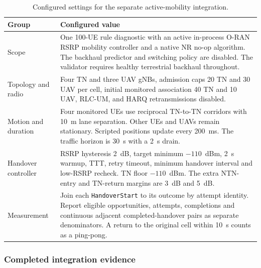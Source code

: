 \begin{table}[t]
\centering
\footnotesize
\caption{Configured settings for the separate active-mobility integration.}
\label{tab:audited_mobility_configuration}
\begin{tabular}{p{} p{}}
\hline
Group & Configured value \\
\hline
Scope & One 100-UE rule diagnostic with an active in-process O-RAN RSRP mobility controller and a native NR no-op algorithm. The backhaul predictor and switching policy are disabled. The validator requires healthy terrestrial backhaul throughout. \\
Topology and radio & Four TN and three UAV gNBs, admission caps 20 TN and 30 UAV per cell, initial monitored association 40 TN and 10 UAV, RLC-UM, and HARQ retransmissions disabled. \\
Motion and duration & Four monitored UEs use reciprocal TN-to-TN corridors with 10~m lane separation. Other UEs and UAVs remain stationary. Scripted positions update every 200~ms. The traffic horizon is 30~s with a 2~s drain. \\
Handover controller & RSRP hysteresis 2~dB, target minimum $-110$~dBm, 2~s warmup, TTT, retry timeout, minimum handover interval and low-RSRP recheck. TN floor $-110$~dBm. The extra NTN-entry and TN-return margins are 3~dB and 5~dB. \\
Measurement & Join each \texttt{HandoverStart} to its outcome by attempt identity. Report eligible opportunities, attempts, completions and continuous adjacent completed-handover pairs as separate denominators. A return to the original cell within 10~s counts as a ping-pong. \\
\hline
\end{tabular}
\end{table}

\subsubsection*{Completed integration evidence}


